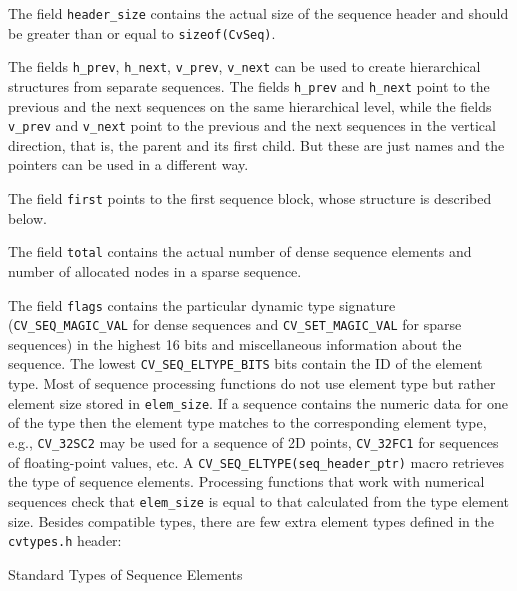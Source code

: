 The field \texttt{header\_size} contains the actual size of the sequence
header and should be greater than or equal to \texttt{sizeof(CvSeq)}.

The fields
\texttt{h\_prev}, \texttt{h\_next}, \texttt{v\_prev}, \texttt{v\_next}
can be used to create hierarchical structures from separate sequences. The
fields \texttt{h\_prev} and \texttt{h\_next} point to the previous and
the next sequences on the same hierarchical level, while the fields
\texttt{v\_prev} and \texttt{v\_next} point to the previous and the
next sequences in the vertical direction, that is, the parent and its first
child. But these are just names and the pointers can be used in a
different way.

The field \texttt{first} points to the first sequence block, whose structure is described below.

The field \texttt{total} contains the actual number of dense sequence elements and number of allocated nodes in a sparse sequence.

The field \texttt{flags} contains the particular dynamic type
signature (\texttt{CV\_SEQ\_MAGIC\_VAL} for dense sequences and
\texttt{CV\_SET\_MAGIC\_VAL} for sparse sequences) in the highest 16
bits and miscellaneous information about the sequence. The lowest
\texttt{CV\_SEQ\_ELTYPE\_BITS} bits contain the ID of the element
type. Most of sequence processing functions do not use element type but rather
element size stored in \texttt{elem\_size}. If a sequence contains the
numeric data for one of the  type then the element type matches
to the corresponding  element type, e.g., \texttt{CV\_32SC2} may be
used for a sequence of 2D points, \texttt{CV\_32FC1} for sequences of floating-point
values, etc. A \texttt{CV\_SEQ\_ELTYPE(seq\_header\_ptr)} macro retrieves the
type of sequence elements. Processing functions that work with numerical
sequences check that \texttt{elem\_size} is equal to that calculated from
the type element size. Besides  compatible types, there
are few extra element types defined in the \texttt{cvtypes.h} header:

Standard Types of Sequence Elements

